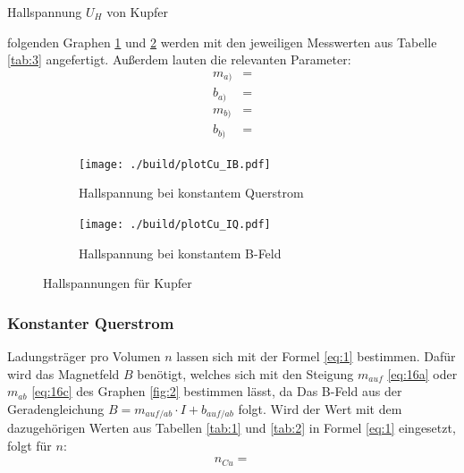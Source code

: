 \begin{table}[H]
    \centering
    
    \caption{Hallspannung $U_H$ von Kupfer}
    \label{tab:3}
\end{table}

\justifying folgenden Graphen \ref{fig:3a} und \ref{fig:3b} werden mit den jeweiligen Messwerten aus Tabelle \ref{tab:3} 
angefertigt. Außerdem lauten die relevanten Parameter: 
\begin{subequations} \label{eq:17}
\begin{align}
    m_{a)} &= \text{} \label{eq:17a}\\
    b_{a)} &= \text{} \label{eq:17b}\\
    m_{b)} &= \text{} \label{eq:17c}\\
    b_{b)} &= \text{} \label{eq:17d}
\end{align}
\end{subequations}

\begin{figure}[H]
\begin{subfigure}{0.495\linewidth}
\centering
\texttt{[image: ./build/plotCu\_IB.pdf]}
\caption{Hallspannung bei konstantem Querstrom}
\label{fig:3a}
\end{subfigure}
\begin{subfigure}{0.495\linewidth}
\centering
\texttt{[image: ./build/plotCu\_IQ.pdf]}
\caption{Hallspannung bei konstantem B-Feld}
\label{fig:3b}
\end{subfigure}
\caption{Hallspannungen für Kupfer}
\label{fig:3}
\end{figure}

\subsubsection{Konstanter Querstrom} \label{sec:5.3.1}
 
\justifying Ladungsträger pro Volumen $n$ lassen sich mit der Formel \eqref{eq:1} bestimmen. Dafür wird das Magnetfeld $B$
benötigt, welches sich mit den Steigung $m_{auf}$ \eqref{eq:16a} oder $m_{ab}$ \eqref{eq:16c} des Graphen \ref{fig:2} bestimmen lässt, da 
Das B-Feld aus der Geradengleichung $B = m_{auf/ab} \cdot I + b_{auf/ab}$ folgt. Wird der Wert mit dem dazugehörigen Werten aus
Tabellen \ref{tab:1} und \ref{tab:2} in Formel \eqref{eq:1} eingesetzt, folgt für $n$:
\begin{align}
    n_{Cu} = \text{} \label{eq:18}
\end{align}

